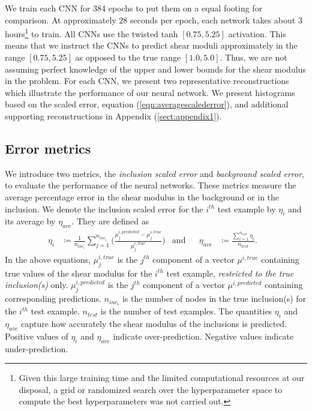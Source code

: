\documentclass[12pt]{article}
\begin{document}
We train each CNN for 384 epochs to put them on a equal footing for comparison. At approximately ${28}$ seconds per epoch, each network takes about $3$ hours\footnote{Given this large training time and the limited computational resources at our disposal, a grid or randomized search over the hyperparameter space to compute the best hyperparameters was not carried out.} to train. All CNNs use the twisted tanh $[0.75,5.25]$ activation. This means that we instruct the CNNs to predict shear moduli approximately in the range $[0.75,5.25]$ as opposed to the true range $[1.0,5.0]$. Thus, we are not assuming perfect knowledge of the upper and lower bounds for the shear modulus in the problem. For each CNN, we present two representative reconstructions which illustrate the performance of our neural network. We present histograms based on the scaled error, equation (\ref{eqn:averagescalederror}), and additional supporting reconstructions in Appendix (\ref{sect:appendix1}).

\subsection{Error metrics}
We introduce two metrics, the \textit{inclusion scaled error} and \textit{background scaled error}, to evaluate the performance of the neural networks. These metrics  measure the average percentage error in the shear modulus in the background or in the inclusion. We denote the inclusion scaled error for the $i^{th}$ test example by $\eta_{i}$ and its average by $\eta_{ave}$. They are defined as 
  \begin{align}
  \eta_{i} &\coloneqq \frac{1}{n_{inc_i}}\sum_{j=1}^{n_{inc_i}}{\Bigg (}\frac{\mu^{i,predicted}_{j}-\mu^{i,true}_{j}}{\mu^{i,true}_{j}}{\Bigg )} &\text{and}  && \eta_{ave} &\coloneqq \frac{\sum_{i=1}^{n_{test}}\eta_{i}}{n_{test}}. &\label{eqn:averageincscalederror}
  \end{align}
In the above equations, $\mu_{j}^{i,true}$ is the $j^{th}$ component of a vector $\mu^{i,true}$ containing true values of the shear modulus for the $i^{th}$ test example, \textit{restricted to the true inclusion(s)} only. $\mu_{j}^{i,predicted}$ is the $j^{th}$ component of a vector $\mu^{i,predicted}$ containing corresponding predictions. $n_{inc_i}$ is the number of nodes in the true inclusion(s) for the $i^{th}$ test example. $n_{test}$ is the number of test examples. The quantities $\eta_i$ and $\eta_{ave}$ capture how accurately the shear modulus of the inclusions is predicted. Positive values of $\eta_i$ and $\eta_{ave}$ indicate over-prediction. Negative values indicate under-prediction.
\end{document}
